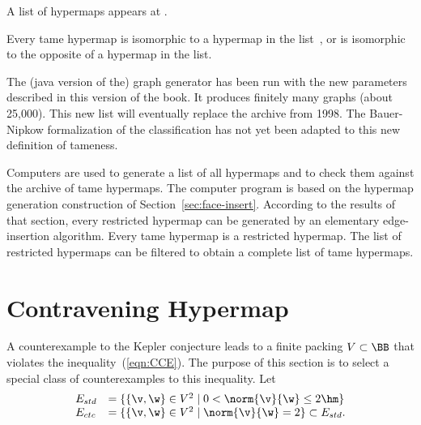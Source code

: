 A list of hypermaps appears at \cite{website:Hales:1998:Code}.

\begin{theorem}
  \label{theorem:classification} Every tame hypermap is isomorphic to
  a hypermap in the list~\cite{website:Hales:1998:Code}, or is
  isomorphic to the opposite of a hypermap in the list.
\end{theorem}

\begin{note}%
  The (java version of the) graph generator has been run with the new
  parameters described in this version of the book.  It produces
  finitely many graphs (about 25,000).  This new list will eventually
  replace the archive from 1998.  The Bauer-Nipkow formalization of
  the classification has not yet been adapted to this new definition
  of tameness.  %
\end{note}


Computers are used to generate a list of all hypermaps and to check
them against the archive of tame hypermaps.  The computer program is
based on the hypermap generation construction of
Section~\ref{sec:face-insert}.  According to the results of that
section, every restricted hypermap can be generated by an elementary
edge-insertion algorithm.  Every tame hypermap is a restricted
hypermap.  The list of restricted hypermaps can be filtered to obtain
a complete list of tame hypermaps.  %

\section{Contravening Hypermap}

%
A counterexample to the Kepler conjecture leads to a finite packing
$V\subset \BB$ that violates the inequality~(\ref{eqn:CCE}).  The
purpose of this section is to select a special class of
counterexamples to this inequality.  Let
\begin{equation}\label{eqn:fan-edge}
\begin{array}{lll}
E_{std} &= \{\{\v,\w\}\in V^2\mid 0 < \norm{\v}{\w}\le 2\hm \}\\
E_{ctc} &= \{\{\v,\w\}\in V^2\mid \norm{\v}{\w}= 2 \}\subset E_{std}.
\end{array}
\end{equation}

